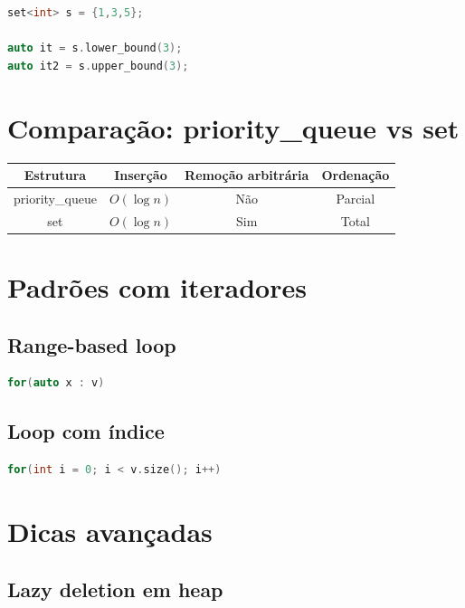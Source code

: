 \documentclass[11pt]{article}
\begin{document}
\begin{lstlisting}[language=C++]
set<int> s = {1,3,5};

auto it = s.lower_bound(3);
auto it2 = s.upper_bound(3);
\end{lstlisting}

\section{Comparação: priority\_queue vs set}

\begin{center}
\begin{tabular}{|c|c|c|c|}
\hline
Estrutura & Inserção & Remoção arbitrária & Ordenação \\
\hline
priority\_queue & $O(\log n)$ & Não & Parcial \\
set & $O(\log n)$ & Sim & Total \\
\hline
\end{tabular}
\end{center}

\section{Padrões com iteradores}

\subsection{Range-based loop}

\begin{lstlisting}[language=C++]
for(auto x : v)
\end{lstlisting}

\subsection{Loop com índice}

\begin{lstlisting}[language=C++]
for(int i = 0; i < v.size(); i++)
\end{lstlisting}

\section{Dicas avançadas}

\subsection{Lazy deletion em heap}
\end{document}
